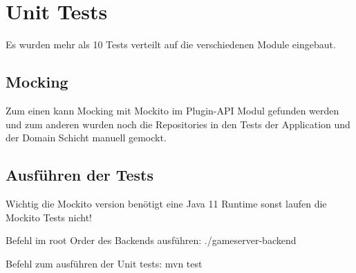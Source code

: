 \chapter{Unit Tests}

Es wurden mehr als 10 Tests verteilt auf die verschiedenen Module eingebaut.

\section{Mocking}

Zum einen kann Mocking mit Mockito im Plugin-API Modul gefunden werden und zum anderen wurden noch die Repositories in den Tests der Application und der Domain Schicht manuell gemockt.

\section{Ausführen der Tests}

Wichtig die Mockito version benötigt eine Java 11 Runtime sonst laufen die Mockito Tests nicht!

Befehl im root Order des Backends ausführen: ./gameserver-backend

Befehl zum ausführen der Unit tests: mvn test